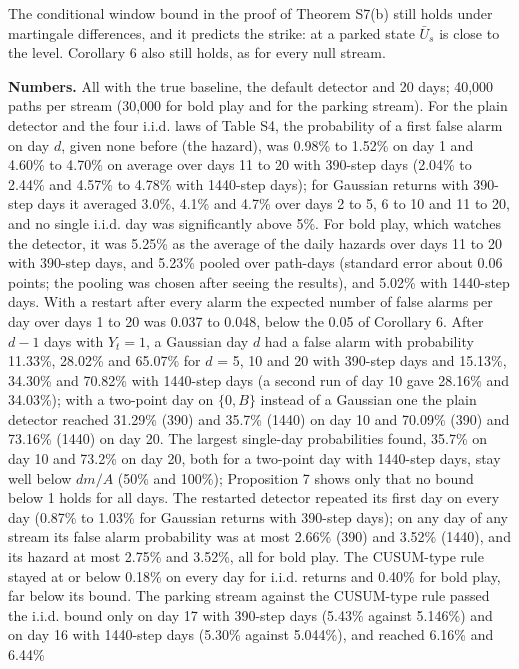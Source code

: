 \documentclass[
]{article}
\begin{document}
The conditional window bound in the proof of Theorem S7(b) still holds
under martingale differences, and it predicts the strike: at a parked
state \(\bar U_s\) is close to the level. Corollary 6 also still holds,
as for every null stream.

\textbf{Numbers.} All with the true baseline, the default detector and
20 days; 40,000 paths per stream (30,000 for bold play and for the
parking stream). For the plain detector and the four i.i.d. laws of
Table S4, the probability of a first false alarm on day \(d\), given
none before (the hazard), was 0.98\% to 1.52\% on day 1 and 4.60\% to
4.70\% on average over days 11 to 20 with 390-step days (2.04\% to
2.44\% and 4.57\% to 4.78\% with 1440-step days); for Gaussian returns
with 390-step days it averaged 3.0\%, 4.1\% and 4.7\% over days 2 to 5,
6 to 10 and 11 to 20, and no single i.i.d. day was significantly above
5\%. For bold play, which watches the detector, it was 5.25\% as the
average of the daily hazards over days 11 to 20 with 390-step days, and
5.23\% pooled over path-days (standard error about 0.06 points; the
pooling was chosen after seeing the results), and 5.02\% with 1440-step
days. With a restart after every alarm the expected number of false
alarms per day over days 1 to 20 was 0.037 to 0.048, below the 0.05 of
Corollary 6. After \(d - 1\) days with \(Y_t = 1\), a Gaussian day \(d\)
had a false alarm with probability 11.33\%, 28.02\% and 65.07\% for
\(d\) = 5, 10 and 20 with 390-step days and 15.13\%, 34.30\% and 70.82\%
with 1440-step days (a second run of day 10 gave 28.16\% and 34.03\%);
with a two-point day on \(\lbrace 0, B\rbrace\) instead of a Gaussian
one the plain detector reached 31.29\% (390) and 35.7\% (1440) on day 10
and 70.09\% (390) and 73.16\% (1440) on day 20. The largest single-day
probabilities found, 35.7\% on day 10 and 73.2\% on day 20, both for a
two-point day with 1440-step days, stay well below \(dm/A\) (50\% and
100\%); Proposition 7 shows only that no bound below 1 holds for all
days. The restarted detector repeated its first day on every day (0.87\%
to 1.03\% for Gaussian returns with 390-step days); on any day of any
stream its false alarm probability was at most 2.66\% (390) and 3.52\%
(1440), and its hazard at most 2.75\% and 3.52\%, all for bold play. The
CUSUM-type rule stayed at or below 0.18\% on every day for i.i.d.
returns and 0.40\% for bold play, far below its bound. The parking
stream against the CUSUM-type rule passed the i.i.d. bound only on day
17 with 390-step days (5.43\% against 5.146\%) and on day 16 with
1440-step days (5.30\% against 5.044\%), and reached 6.16\% and 6.44\%
\end{document}
